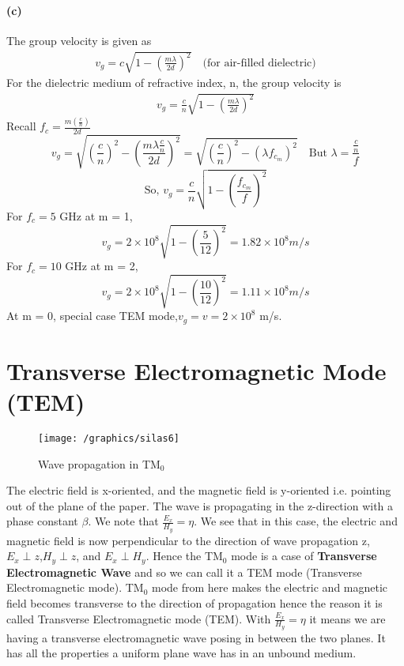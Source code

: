 \begin{exmp}
\paragraph{(c)} The group velocity is given as
\begin{align*}
v_g = c\sqrt{1 - \left(\frac{m\lambda}{2d}\right)^2}\quad\text{(for air-filled dielectric)}
\end{align*}
For the dielectric medium of refractive index, n, the group velocity is
\begin{align*}
v_g = \frac{c}{n}\sqrt{1 - \left(\frac{m\lambda}{2d}\right)^2}
\end{align*}
Recall $f_c = \frac{m\left(\frac{c}{n}\right)}{2d}$
\begin{dmath*}
v_g = \sqrt{\left(\frac{c}{n}\right)^2 - \left(\frac{m\lambda\frac{c}{n}}{2d}\right)^2}
= \sqrt{\left(\frac{c}{n}\right)^2 - (\lambda f_{c_m})^2}\quad\text{But $\lambda = \frac{\frac{c}{n}}{f}$}
\end{dmath*}
\begin{dmath}
\text{So, }v_g = \frac{c}{n}\sqrt{1 - \left(\frac{f_{c_m}}{f}\right)^2}
\label{eqn:grpvel3}
\end{dmath}
For $f_c = 5$ GHz at m = 1,
\begin{dmath*}
v_g = 2\times10^8\sqrt{1 - \left(\frac{5}{12}\right)^2} = 1.82\times10^8 m/s
\end{dmath*}
For $f_{c} = 10$ GHz at m = 2,
\begin{dmath*}
v_g = 2\times10^8\sqrt{1 - \left(\frac{10}{12}\right)^2} = 1.11\times10^8 m/s
\end{dmath*}
At m = 0, special case TEM mode,$v_g = v = 2\times10^8$ m/s.
\end{exmp}

\section{Transverse Electromagnetic Mode (TEM)}
\begin{figure}[h]
\centering
\texttt{[image: /graphics/silas6]}
\caption{Wave propagation in TM$_0$}
\label{fig:silas6}
\end{figure}
The electric field is x-oriented, and the magnetic field is y-oriented i.e. pointing out of the plane of the paper. The wave is propagating in the z-direction with a phase constant $\beta$. We note that $\frac{E_{x}}{H_{y}} = \eta$. We see that in this case, the electric and magnetic field is now perpendicular to the direction of wave propagation z, $E_{x}\perp z$,$H_{y}\perp z$, and $E_{x}\perp H_{y}$. Hence the TM$_0$ mode is a case of \textbf{Transverse Electromagnetic Wave} and so we can call it a TEM mode (Transverse Electromagnetic mode). TM$_0$ mode from here makes the electric and magnetic field becomes transverse to the direction of propagation hence the reason it is called Transverse Electromagnetic mode (TEM). With $\frac{E_{x}}{H_{y}} = \eta$ it means we are having a transverse electromagnetic wave posing in between the two planes. It has all the properties a uniform plane wave has in an unbound medium.

